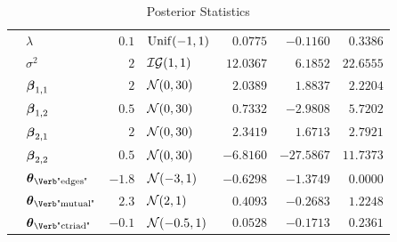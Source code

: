 \begin{table}[t]
\begin{tabular}{cl|rlrrr}
        & $\lambda$                        & $0.1$  & $\mathrm{Unif}(-1,1)$     & $0.0775$  & $-0.1160$  & $0.3386$  \\
        & $\sigma^2$                       & $2$    & $\mathcal{IG}(1,1)$ & $12.0367$ & $6.1852$   & $22.6555$ \\
        & $\boldsymbol{\beta}_{1,1}$                   & $2$    & $\mathcal{N}(0,30)$      & $2.0389$  & $1.8837$   & $2.2204$  \\
        & $\boldsymbol{\beta}_{1,2}$                   & $0.5$  & $\mathcal{N}(0,30)$      & $0.7332$  & $-2.9808$  & $5.7202$  \\
        & $\boldsymbol{\beta}_{2,1}$                   & $2$    & $\mathcal{N}(0,30)$      & $2.3419$  & $1.6713$   & $2.7921$  \\
        & $\boldsymbol{\beta}_{2,2}$                   & $0.5$  & $\mathcal{N}(0,30)$      & $-6.8160$ & $-27.5867$ & $11.7373$ \\
        & $\ttheta_{\text{\Verb"edges"}}$  & $-1.8$ & $\mathcal{N}(-3,1)$      & $-0.6298$ & $-1.3749$  & $0.0000$  \\
        & $\ttheta_{\text{\Verb"mutual"}}$ & $2.3$  & $\mathcal{N}(2,1)$       & $0.4093$  & $-0.2683$  & $1.2248$  \\
        & $\ttheta_{\text{\Verb"ctriad"}}$ & $-0.1$ & $\mathcal{N}(-0.5,1)$    & $0.0528$  & $-0.1713$  & $0.2361$  \\
		\bottomrule
	\end{tabular}
	\caption{Posterior Statistics}
	\label{tab:S1}
\end{table}
